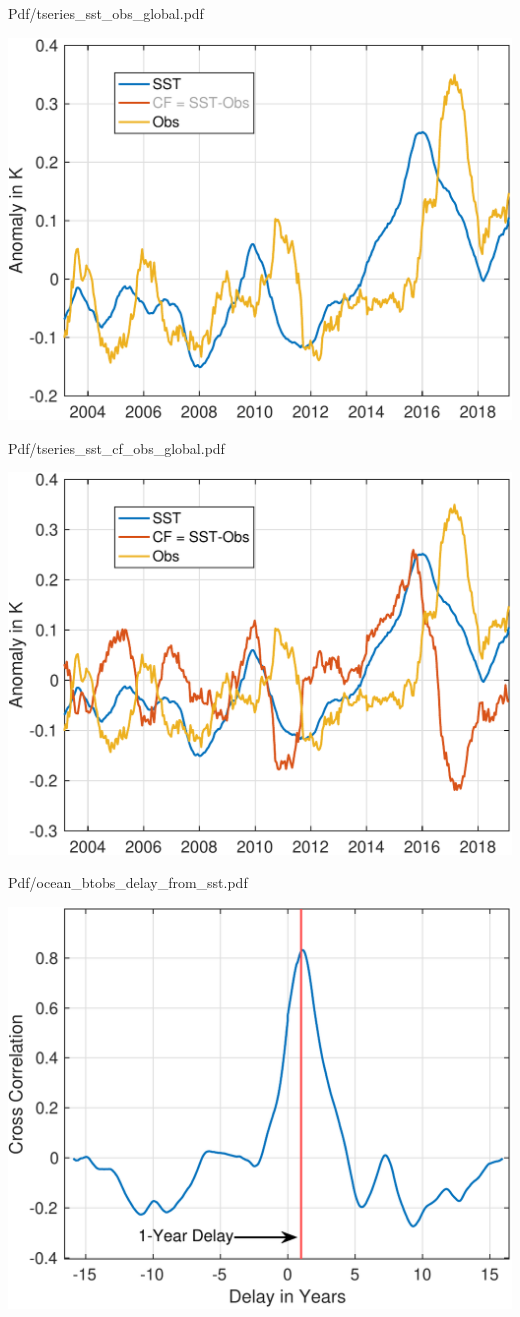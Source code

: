 \documentclass[10pt,t]{beamer}
\begin{document}
\begin{frame}[label={sec:org86dcffe}]{Pdf/tseries\_sst\_obs\_global.pdf}
\begin{center}
\includegraphics[width=0.7\linewidth]{./Figs/Pdf/tseries_sst_obs_global.pdf}
\end{center}
\end{frame}

\begin{frame}[label={sec:org6885406}]{Pdf/tseries\_sst\_cf\_obs\_global.pdf}
\begin{center}
\includegraphics[width=0.7\linewidth]{./Figs/Pdf/tseries_sst_cf_obs_global.pdf}
\end{center}
\end{frame}

\begin{frame}[label={sec:org2eddeee}]{Pdf/ocean\_btobs\_delay\_from\_sst.pdf}
\begin{center}
\includegraphics[width=0.7\linewidth]{./Figs/Pdf/ocean_btobs_delay_from_sst.pdf}
\end{center}
\end{frame}
\end{document}
